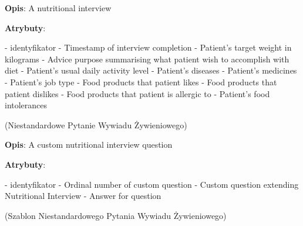 \begin{enumerate}[label={\textbf{KAT/\protect\threedigits{\theenumi}}}, wide, labelwidth=!, labelindent=0pt, labelsep=0pt, series=reqs]
    \textbf{Opis}: A nutritional interview
    \par
    \textbf{Atrybuty}:
    \begin{itemize}[series=atr, wide, align=left, leftmargin=190pt]
         \label{kat:NutritionalInterview:id} - identyfikator
         \label{kat:NutritionalInterview:completionDate} - Timestamp of interview completion
         \label{kat:NutritionalInterview:targetWeight} - Patient's target weight in kilograms
         \label{kat:NutritionalInterview:advicePurpose} - Advice purpose summarising what patient wish to accomplish with diet
         \label{kat:NutritionalInterview:physicalActivity} - Patient's usual daily activity level
         \label{kat:NutritionalInterview:diseases} - Patient's diseases
         \label{kat:NutritionalInterview:medicines} - Patient's medicines
         \label{kat:NutritionalInterview:jobType} - Patient's job type
         \label{kat:NutritionalInterview:likedProducts} - Food products that patient likes
         \label{kat:NutritionalInterview:dislikedProducts} - Food products that patient dislikes
         \label{kat:NutritionalInterview:foodAllergies} - Food products that patient is allergic to
         \label{kat:NutritionalInterview:foodIntolerances} - Patient's food intolerances
    \end{itemize}

     \label{kat:CustomNutritionalInterviewQuestion} (Niestandardowe Pytanie Wywiadu Żywieniowego)

    \textbf{Opis}: A custom nutritional interview question
    \par
    \textbf{Atrybuty}:
    \begin{itemize}[series=atr, wide, align=left, leftmargin=190pt]
         \label{kat:CustomNutritionalInterviewQuestion:id} - identyfikator
         \label{kat:CustomNutritionalInterviewQuestion:ordinalNumber} - Ordinal number of custom question
         \label{kat:CustomNutritionalInterviewQuestion:question} - Custom question extending Nutritional Interview
         \label{kat:CustomNutritionalInterviewQuestion:answer} - Answer for question
    \end{itemize}

     \label{kat:CustomNutritionalInterviewQuestionTemplate} (Szablon Niestandardowego Pytania Wywiadu Żywieniowego)


\end{enumerate}
